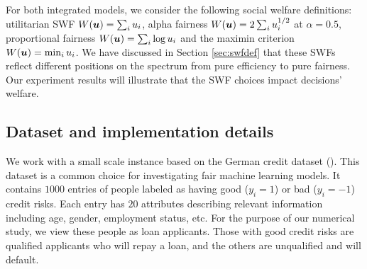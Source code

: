 \documentclass{article}[11pt]
\begin{document}

For both integrated models, we consider the following social welfare definitions: utilitarian SWF $W(\bm{u}) = \sum_i u_i$, alpha fairness $W(\bm{u}) = 2\sum_i u_i^{1/2}$ at $\alpha = 0.5$, proportional fairness $W(\bm{u}) = \sum_i \log{u_i}$ and the maximin criterion $W(\bm{u}) = \min_i u_i$. We have discussed in Section \ref{sec:swfdef} that these SWFs reflect different positions on the spectrum from pure efficiency to pure fairness. Our experiment results will illustrate that the SWF choices impact decisions' welfare. 


\subsection{Dataset and implementation details}
We work with a small scale instance based on the German credit dataset (\cite{german}). This dataset is a common choice for investigating fair machine learning models. It contains $1000$ entries of people labeled as having good ($y_i = 1$) or bad ($y_i = -1$) credit risks. Each entry has $20$ attributes describing relevant information including age, gender, employment status, etc. For the purpose of our numerical study, we view these people as loan applicants. Those with good credit risks are qualified applicants who will repay a loan, and the others are unqualified and will default. 
\end{document}
